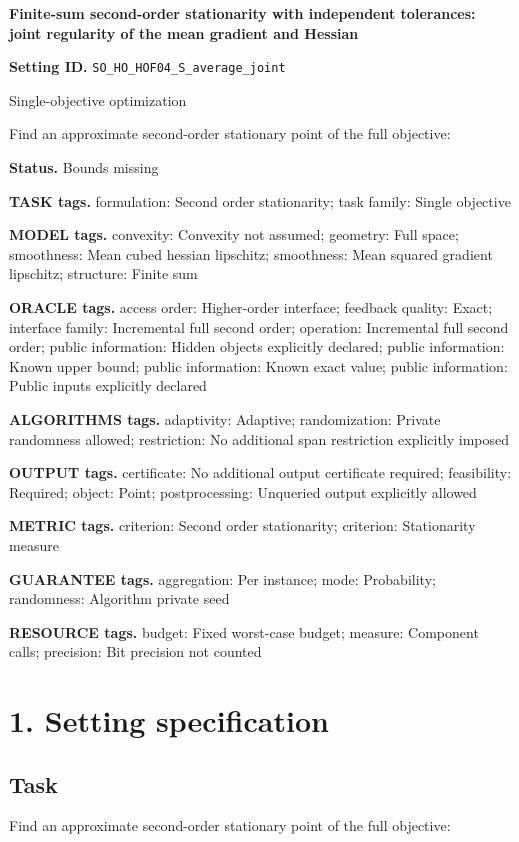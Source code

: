 \documentclass[10pt,a4paper]{article}
\begin{document}
\raggedright

{\LARGE\bfseries\sffamily\color{AtlasNavy} Finite-sum second-order stationarity with independent tolerances: joint regularity of the mean gradient and Hessian\par}\vspace{5pt}
\textbf{Setting ID.} \texttt{SO\_\allowbreak{}HO\_\allowbreak{}HOF04\_\allowbreak{}S\_\allowbreak{}average\_\allowbreak{}joint}

Single-objective optimization

Find an approximate second-order stationary point of the full objective:

\textbf{Status.} Bounds missing

\textbf{TASK tags.} formulation: Second order stationarity; task family: Single objective

\textbf{MODEL tags.} convexity: Convexity not assumed; geometry: Full space; smoothness: Mean cubed hessian lipschitz; smoothness: Mean squared gradient lipschitz; structure: Finite sum

\textbf{ORACLE tags.} access order: Higher-order interface; feedback quality: Exact; interface family: Incremental full second order; operation: Incremental full second order; public information: Hidden objects explicitly declared; public information: Known upper bound; public information: Known exact value; public information: Public inputs explicitly declared

\textbf{ALGORITHMS tags.} adaptivity: Adaptive; randomization: Private randomness allowed; restriction: No additional span restriction explicitly imposed

\textbf{OUTPUT tags.} certificate: No additional output certificate required; feasibility: Required; object: Point; postprocessing: Unqueried output explicitly allowed

\textbf{METRIC tags.} criterion: Second order stationarity; criterion: Stationarity measure

\textbf{GUARANTEE tags.} aggregation: Per instance; mode: Probability; randomness: Algorithm private seed

\textbf{RESOURCE tags.} budget: Fixed worst-case budget; measure: Component calls; precision: Bit precision not counted

\section{1. Setting specification}
\subsection{Task}
Find an approximate second-order stationary point of the full objective:
\end{document}
